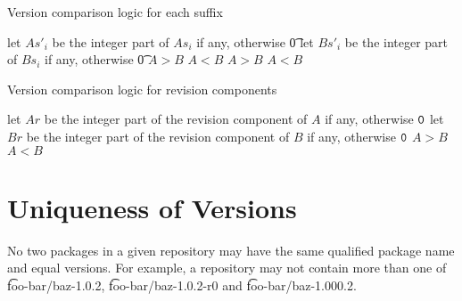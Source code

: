 \begin{algorithm}[p]
\caption{Version comparison logic for each suffix} \label{alg:version-comparison-suffix-each}
\begin{algorithmic}[1]
    \STATE let $As'_i$ be the integer part of $As_i$ if any, otherwise \t{0}
    \STATE let $Bs'_i$ be the integer part of $Bs_i$ if any, otherwise \t{0}
      \RETURN $A>B$
      \RETURN $A<B$
    \ENDIF
    \RETURN $A>B$
  \ELSE
    \RETURN $A<B$
  \ENDIF
\end{algorithmic}
\end{algorithm}

\begin{algorithm}[p]
\caption{Version comparison logic for revision components} \label{alg:version-comparison-revision}
\begin{algorithmic}[1]
  \STATE let $Ar$ be the integer part of the revision component of $A$ if any, otherwise $\texttt{0}$
  \STATE let $Br$ be the integer part of the revision component of $B$ if any, otherwise $\texttt{0}$
    \RETURN $A>B$
    \RETURN $A<B$
  \ENDIF
\end{algorithmic}
\end{algorithm}

\section{Uniqueness of Versions}

No two packages in a given repository may have the same qualified package name and equal versions.
For example, a repository may not contain more than one of \t{foo-bar/baz-1.0.2},
\t{foo-bar/baz-1.0.2-r0} and \t{foo-bar/baz-1.000.2}.


